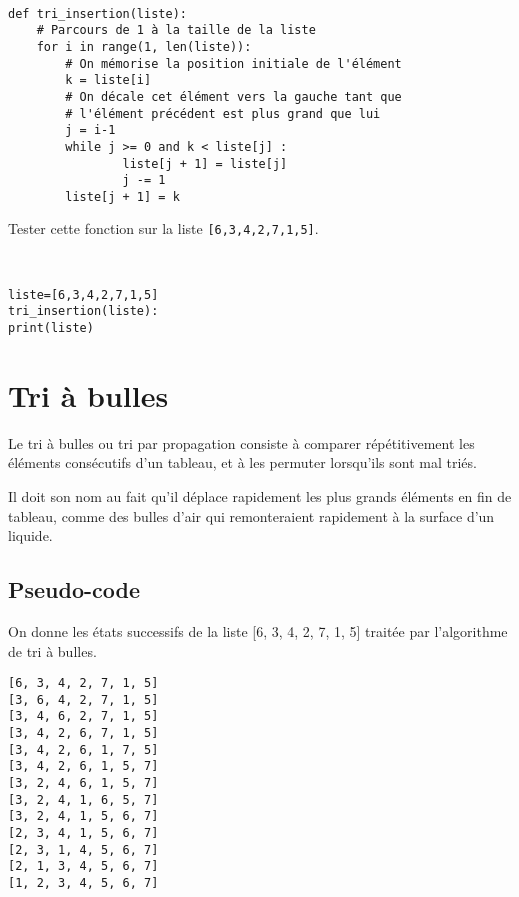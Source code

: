 \begin{solution}~\\
\vspace{-0.7cm}
\begin{verbatim}
def tri_insertion(liste): 
    # Parcours de 1 à la taille de la liste
    for i in range(1, len(liste)):
        # On mémorise la position initiale de l'élément
        k = liste[i]
        # On décale cet élément vers la gauche tant que
        # l'élément précédent est plus grand que lui
        j = i-1
        while j >= 0 and k < liste[j] : 
                liste[j + 1] = liste[j] 
                j -= 1
        liste[j + 1] = k
\end{verbatim}    
\end{solution}

\begin{exercice}
Tester cette fonction sur la liste \verb?[6,3,4,2,7,1,5]?.
\end{exercice}

\begin{solution}~\\
\vspace{-0.7cm}
\begin{verbatim}
liste=[6,3,4,2,7,1,5]
tri_insertion(liste): 
print(liste)
\end{verbatim}    
\end{solution}

\section{Tri à bulles}

Le tri à bulles ou tri par propagation consiste à comparer répétitivement les éléments consécutifs d'un tableau, et à les permuter lorsqu'ils sont mal triés. 

Il doit son nom au fait qu'il déplace rapidement les plus grands éléments en fin de tableau, comme des bulles d'air qui remonteraient rapidement à la surface d'un liquide. 

\subsection{Pseudo-code}

On donne les états successifs de la liste [6, 3, 4, 2, 7, 1, 5] traitée par l'algorithme de tri à bulles.

\begin{verbatim}
[6, 3, 4, 2, 7, 1, 5]
[3, 6, 4, 2, 7, 1, 5]
[3, 4, 6, 2, 7, 1, 5]
[3, 4, 2, 6, 7, 1, 5]
[3, 4, 2, 6, 1, 7, 5]
[3, 4, 2, 6, 1, 5, 7]
[3, 2, 4, 6, 1, 5, 7]
[3, 2, 4, 1, 6, 5, 7]
[3, 2, 4, 1, 5, 6, 7]
[2, 3, 4, 1, 5, 6, 7]
[2, 3, 1, 4, 5, 6, 7]
[2, 1, 3, 4, 5, 6, 7]
[1, 2, 3, 4, 5, 6, 7]
\end{verbatim}  

